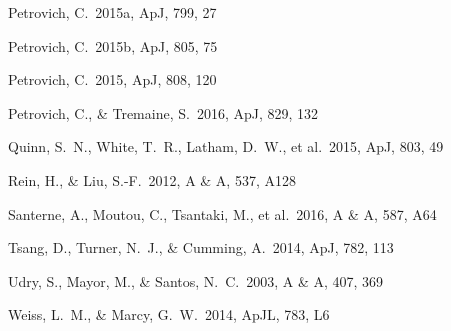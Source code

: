 \documentclass[12pt,useAMS, usenatbib]{mn2e}
\begin{document}
\begin{thebibliography}{}
Petrovich, C.\ 2015a, ApJ, 799, 27  %

Petrovich, C.\ 2015b, ApJ, 805, 75  %

Petrovich, C.\ 2015, ApJ, 808, 120   %

Petrovich, C., \& Tremaine, S.\ 2016, ApJ, 829, 132

Quinn, S.~N., White, T.~R., Latham, D.~W., et al.\ 2015, ApJ, 803, 49

Rein, H., \& Liu, S.-F.\ 2012, A \& A, 537, A128

Santerne, A., Moutou, C., Tsantaki, M., et al.\ 2016, A \& A, 587, A64

Tsang, D., Turner, N.~J., \& Cumming, A.\ 2014, ApJ, 782, 113

Udry, S., Mayor, M., \& Santos, N.~C.\ 2003, A \& A, 407, 369 

Weiss, L.~M., \& Marcy, G.~W.\ 2014, ApJL, 783, L6

\end{thebibliography}{}
\end{document}

